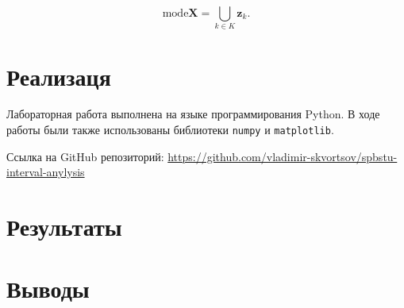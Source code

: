 \documentclass{article}
\begin{document}
  \begin{equation}
    \text{mode} \mathbf{X} = \bigcup_{k \in K} \mathbf{z}_k.
  \end{equation}

  \section{Реализаця}

  Лабораторная работа выполнена на языке программирования Python. В ходе
  работы были также использованы библиотеки \verb!numpy! и
  \verb!matplotlib!.

  Ссылка на GitHub репозиторий:
  \href{https://github.com/vladimir-skvortsov/spbstu-interval-anylysis}
  {https://github.com/vladimir-skvortsov/spbstu-interval-anylysis}

  \section{Результаты}



  \section{Выводы}
\end{document}
